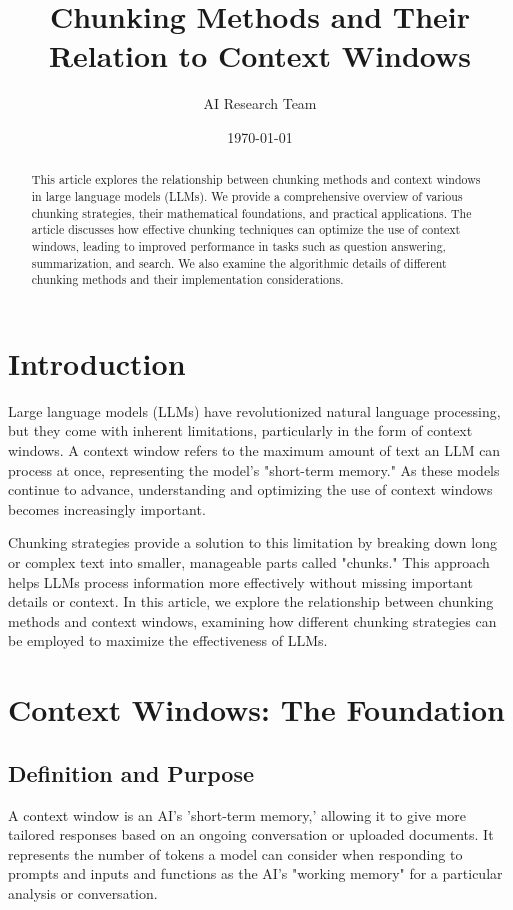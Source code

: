\documentclass{article}
\title{Chunking Methods and Their Relation to Context Windows}
\author{AI Research Team}
\date{\today}
\begin{document}
\maketitle

\begin{abstract}
This article explores the relationship between chunking methods and context windows in large language models (LLMs). We provide a comprehensive overview of various chunking strategies, their mathematical foundations, and practical applications. The article discusses how effective chunking techniques can optimize the use of context windows, leading to improved performance in tasks such as question answering, summarization, and search. We also examine the algorithmic details of different chunking methods and their implementation considerations.
\end{abstract}

\section{Introduction}

Large language models (LLMs) have revolutionized natural language processing, but they come with inherent limitations, particularly in the form of context windows. A context window refers to the maximum amount of text an LLM can process at once, representing the model's "short-term memory." As these models continue to advance, understanding and optimizing the use of context windows becomes increasingly important.

Chunking strategies provide a solution to this limitation by breaking down long or complex text into smaller, manageable parts called "chunks." This approach helps LLMs process information more effectively without missing important details or context. In this article, we explore the relationship between chunking methods and context windows, examining how different chunking strategies can be employed to maximize the effectiveness of LLMs.

\section{Context Windows: The Foundation}

\subsection{Definition and Purpose}

A context window is an AI's 'short-term memory,' allowing it to give more tailored responses based on an ongoing conversation or uploaded documents. It represents the number of tokens a model can consider when responding to prompts and inputs and functions as the AI's "working memory" for a particular analysis or conversation.
\end{document}
